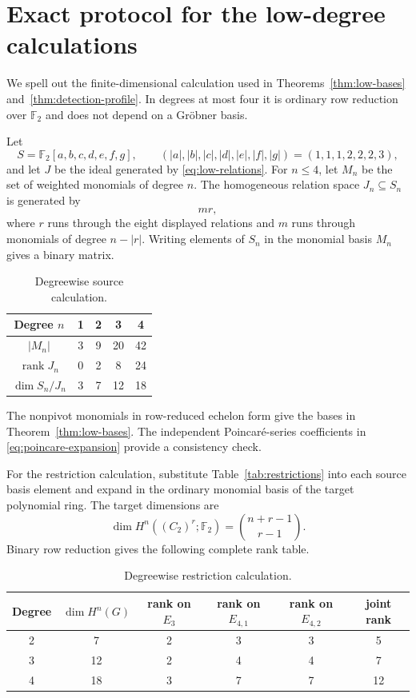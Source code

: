 \documentclass[11pt]{amsart}
\theoremstyle{definition}
\theoremstyle{remark}
\DeclareMathOperator{\rank}{rank}
\newcommand{\F}{\mathbb F}
\begin{document}
\appendix

\section{Exact protocol for the low-degree calculations}
\label{app:computation}

We spell out the finite-dimensional calculation used in Theorems~\ref{thm:low-bases} and~\ref{thm:detection-profile}.  In degrees at most four it is ordinary row reduction over $\F_2$ and does not depend on a Gröbner basis.

Let
\[
S=\F_2[a,b,c,d,e,f,g],
\qquad
(|a|,|b|,|c|,|d|,|e|,|f|,|g|)=(1,1,1,2,2,2,3),
\]
and let \(J\) be the ideal generated by \eqref{eq:low-relations}.  For \(n\leq4\), let \(M_n\) be the set of weighted monomials of degree \(n\).  The homogeneous relation space \(J_n\subseteq S_n\) is generated by
\[
mr,
\]
where \(r\) runs through the eight displayed relations and \(m\) runs through monomials of degree \(n-|r|\).  Writing elements of \(S_n\) in the monomial basis \(M_n\) gives a binary matrix.

\begin{table}[ht]
\centering
\caption{Degreewise source calculation.}
\begin{tabular}{@{}ccccc@{}}
\toprule
Degree \(n\) & 1 & 2 & 3 & 4 \\
\midrule
\(|M_n|\) & 3 & 9 & 20 & 42 \\
\(\rank J_n\) & 0 & 2 & 8 & 24 \\
\(\dim S_n/J_n\) & 3 & 7 & 12 & 18 \\
\bottomrule
\end{tabular}
\end{table}

The nonpivot monomials in row-reduced echelon form give the bases in Theorem~\ref{thm:low-bases}.  The independent Poincaré-series coefficients in \eqref{eq:poincare-expansion} provide a consistency check.

For the restriction calculation, substitute Table~\ref{tab:restrictions} into each source basis element and expand in the ordinary monomial basis of the target polynomial ring.  The target dimensions are
\[
\dim H^n((C_2)^r;\F_2)=\binom{n+r-1}{r-1}.
\]
Binary row reduction gives the following complete rank table.

\begin{table}[ht]
\centering
\caption{Degreewise restriction calculation.}
\begin{tabular}{@{}cccccc@{}}
\toprule
Degree & \(\dim H^n(G)\) & rank on \(E_3\) & rank on \(E_{4,1}\) & rank on \(E_{4,2}\) & joint rank \\
\midrule
2 & 7  & 2 & 3 & 3 & 5 \\
3 & 12 & 2 & 4 & 4 & 7 \\
4 & 18 & 3 & 7 & 7 & 12 \\
\bottomrule
\end{tabular}
\end{table}
\end{document}
